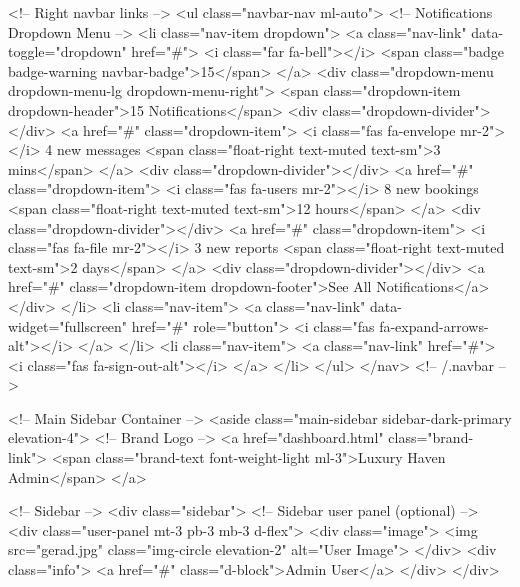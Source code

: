         <!-- Right navbar links -->
        <ul class="navbar-nav ml-auto">
            <!-- Notifications Dropdown Menu -->
            <li class="nav-item dropdown">
                <a class="nav-link" data-toggle="dropdown" href="#">
                    <i class="far fa-bell"></i>
                    <span class="badge badge-warning navbar-badge">15</span>
                </a>
                <div class="dropdown-menu dropdown-menu-lg dropdown-menu-right">
                    <span class="dropdown-item dropdown-header">15 Notifications</span>
                    <div class="dropdown-divider"></div>
                    <a href="#" class="dropdown-item">
                        <i class="fas fa-envelope mr-2"></i> 4 new messages
                        <span class="float-right text-muted text-sm">3 mins</span>
                    </a>
                    <div class="dropdown-divider"></div>
                    <a href="#" class="dropdown-item">
                        <i class="fas fa-users mr-2"></i> 8 new bookings
                        <span class="float-right text-muted text-sm">12 hours</span>
                    </a>
                    <div class="dropdown-divider"></div>
                    <a href="#" class="dropdown-item">
                        <i class="fas fa-file mr-2"></i> 3 new reports
                        <span class="float-right text-muted text-sm">2 days</span>
                    </a>
                    <div class="dropdown-divider"></div>
                    <a href="#" class="dropdown-item dropdown-footer">See All Notifications</a>
                </div>
            </li>
            <li class="nav-item">
                <a class="nav-link" data-widget="fullscreen" href="#" role="button">
                    <i class="fas fa-expand-arrows-alt"></i>
                </a>
            </li>
            <li class="nav-item">
                <a class="nav-link" href="#">
                    <i class="fas fa-sign-out-alt"></i>
                </a>
            </li>
        </ul>
    </nav>
    <!-- /.navbar -->

    <!-- Main Sidebar Container -->
    <aside class="main-sidebar sidebar-dark-primary elevation-4">
        <!-- Brand Logo -->
        <a href="dashboard.html" class="brand-link">
            <span class="brand-text font-weight-light ml-3">Luxury Haven Admin</span>
        </a>

        <!-- Sidebar -->
        <div class="sidebar">
            <!-- Sidebar user panel (optional) -->
            <div class="user-panel mt-3 pb-3 mb-3 d-flex">
                <div class="image">
                    <img src="gerad.jpg" class="img-circle elevation-2" alt="User Image">
                </div>
                <div class="info">
                    <a href="#" class="d-block">Admin User</a>
                </div>
            </div>

